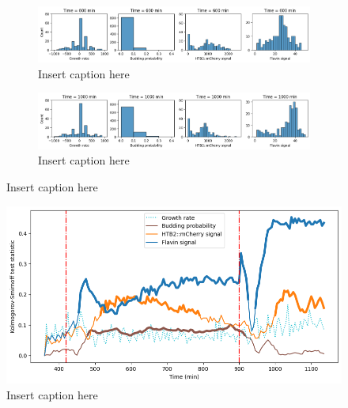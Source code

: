 \begin{figure}
  \begin{subfigure}[htpb]{0.9\textwidth}
   \centering
   \includegraphics[width=\textwidth]{19972_distribs_0600}
   \caption{
     Insert caption here
   }
   \label{fig:biology-starvation-distribs-0600}
  \end{subfigure}

  \begin{subfigure}[htpb]{0.9\textwidth}
   \centering
   \includegraphics[width=\textwidth]{19972_distribs_1000}
   \caption{
     Insert caption here
   }
   \label{fig:biology-starvation-distribs-1000}
  \end{subfigure}

  \caption{
    Insert caption here
  }
  \label{fig:biology-starvation-distribs}
\end{figure}


\begin{figure}
  \centering
  \includegraphics[width=\textwidth]{19972_ks_highlight}
  \caption{
    Insert caption here
  }
  \label{fig:biology-starvation-ks}
\end{figure}


